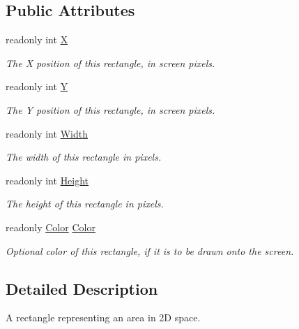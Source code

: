 \subsection*{Public Attributes}
\begin{DoxyCompactItemize}
\item 
readonly int \hyperlink{struct_tri_devs_1_1_tri_engine_1_1_rectangle_a7aa76fc1fe420a06617ed0642f4aaca0}{X}
\begin{DoxyCompactList}\small\item\em The X position of this rectangle, in screen pixels. \end{DoxyCompactList}\item 
readonly int \hyperlink{struct_tri_devs_1_1_tri_engine_1_1_rectangle_acca174d01cbb82151fc769fcaf7a97e4}{Y}
\begin{DoxyCompactList}\small\item\em The Y position of this rectangle, in screen pixels. \end{DoxyCompactList}\item 
readonly int \hyperlink{struct_tri_devs_1_1_tri_engine_1_1_rectangle_a290425f699b44898216275f26b585bf0}{Width}
\begin{DoxyCompactList}\small\item\em The width of this rectangle in pixels. \end{DoxyCompactList}\item 
readonly int \hyperlink{struct_tri_devs_1_1_tri_engine_1_1_rectangle_ab658107474a933269cab1d3dcbb46cf0}{Height}
\begin{DoxyCompactList}\small\item\em The height of this rectangle in pixels. \end{DoxyCompactList}\item 
readonly \hyperlink{struct_tri_devs_1_1_tri_engine_1_1_color}{Color} \hyperlink{struct_tri_devs_1_1_tri_engine_1_1_rectangle_a7d89328df1188361322d0266c3e9c472}{Color}
\begin{DoxyCompactList}\small\item\em Optional color of this rectangle, if it is to be drawn onto the screen. \end{DoxyCompactList}\end{DoxyCompactItemize}


\subsection{Detailed Description}
A rectangle representing an area in 2\-D space. 



